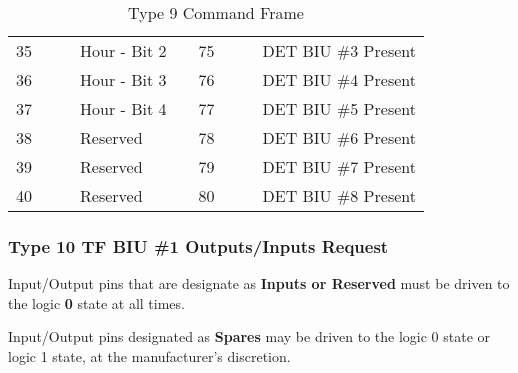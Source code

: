 \documentclass[]{article}
\begin{document}
\begin{table}[ht]
\begin{tabular}{lllllllll}
		35           &                    &                       & Hour - Bit 2                  &                   & 75           &                     &                                                                                   & DET BIU \#3 Present       \\
		36           &                    &                       & Hour - Bit 3                  &                   & 76           &                     &                                                                                   & DET BIU \#4 Present       \\
		37           &                    &                       & Hour - Bit 4                  &                   & 77           &                     &                                                                                   & DET BIU \#5 Present       \\
		38           &                    &                       & Reserved                      &                   & 78           &                     &                                                                                   & DET BIU \#6 Present       \\
		39           &                    &                       & Reserved                      &                   & 79           &                     &                                                                                   & DET BIU \#7 Present       \\
		40           &                    &                       & Reserved                      &                   & 80           &                     &                                                                                   & DET BIU \#8 Present       \\ \cline{1-4} \cline{6-9} 
	\end{tabular}
	\caption{Type 9 Command Frame}
	\label{tab:frame-type-9}
\end{table}

\clearpage
\subsubsection {Type 10 TF BIU \#1 Outputs/Inputs Request}

Input/Output pins that are designate as \textbf{Inputs or Reserved} must be driven to the logic \textbf{0} state at all times.

Input/Output pins designated as \textbf{Spares} may be driven to the logic 0 state or logic 1 state, at the manufacturer's discretion.
\end{document}
